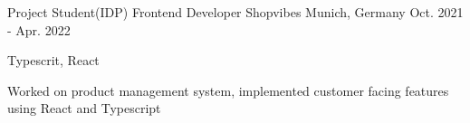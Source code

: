 \begin{cventries}
  \cventry
  {Project Student(IDP) Frontend Developer} %
  {Shopvibes} %
  {Munich, Germany} %
  {Oct. 2021 - Apr. 2022} %
  {
    \begin{cvitems} %
      \item {Typescrit, React}
      \item {Worked on product management system, implemented customer facing features using React and Typescript}
    \end{cvitems}
  }
\end{cventries}
